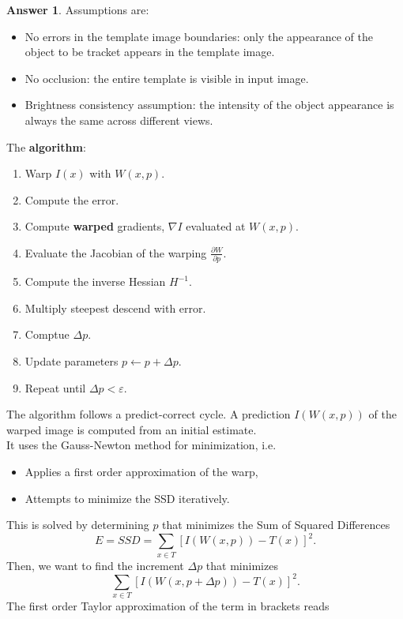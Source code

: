 \documentclass[a4paper,12 pt]{article}
\theoremstyle{definition}
\theoremstyle{remark}
\theoremstyle{definition}
\theoremstyle{definition}
\theoremstyle{definition}
\theoremstyle{definition}
\theoremstyle{remark}
\theoremstyle{remark}
\theoremstyle{definition}
\theoremstyle{definition}
\newtheorem*{answer}{Answer}
\begin{document}
\begin{enumerate}
\begin{enumerate}
\begin{answer}
Assumptions are:
\begin{itemize}
\item No errors in the template image boundaries: only the appearance of the object to be tracket appears in the template image.
\item No occlusion: the entire template is visible in input image.
\item Brightness consistency assumption: the intensity of the object appearance is always the same across different views. 
\end{itemize}
The \textbf{algorithm}:
\begin{enumerate}
\item Warp $I(x)$ with $W(x,p)$.
\item Compute the error.
\item Compute \textbf{warped} gradients, $\nabla I$ evaluated at $W(x,p)$.
\item Evaluate the Jacobian of the warping $\frac{\partial W}{\partial p}$.
\item Compute the inverse Hessian $H^{-1}$.
\item Multiply steepest descend with error.
\item Comptue $\Delta p$.
\item Update parameters $p \leftarrow p+\Delta p$.
\item Repeat until $\Delta p < \varepsilon$.
\end{enumerate}
The algorithm follows a predict-correct cycle. A prediction $I(W(x,p))$ of the warped image is computed from an initial estimate.\\
It uses the Gauss-Newton method for minimization, i.e.
\begin{itemize}
\item Applies a first order approximation of the warp,
\item Attempts to minimize the SSD iteratively.
\end{itemize}
This is solved by determining $p$ that minimizes the Sum of Squared Differences
\begin{equation}
E=SSD=\sum_{x\in T}\left[ I(W(x,p))-T(x)\right]^2.
\end{equation}
 Then, we want to find the increment $\Delta p$ that minimizes
\begin{equation}
\sum_{x\in T}\left[ I(W(x,p+\Delta p))-T(x)\right]^2.
\end{equation}
The first order Taylor approximation of the term in brackets reads
\begin{equation}

\end{equation}
\end{answer}
\end{enumerate}
\end{enumerate}
\end{document}
